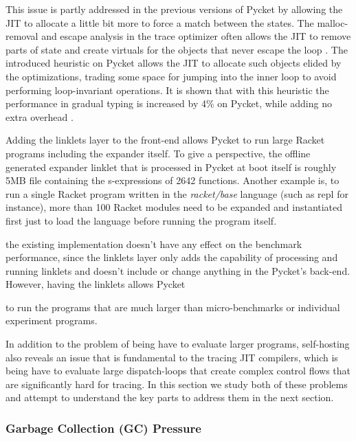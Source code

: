 This issue is partly addressed in the previous versions of Pycket by
allowing the JIT to allocate a little bit more to force a match
between the states. The malloc-removal and escape analysis in the
trace optimizer often allows the JIT to remove parts of state and
create virtuals for the objects that never escape the loop
\cite{malloc-removal:11, loop-aware:12}. The introduced heuristic on
Pycket allows the JIT to allocate such objects elided by the
optimizations, trading some space for jumping into the inner loop to
avoid performing loop-invariant operations. It is shown that with this
heuristic the performance in gradual typing is increased by 4\% on
Pycket, while adding no extra overhead \cite{pycket17}.

Adding the linklets layer to the front-end allows Pycket to run large
Racket programs including the expander itself. To give a perspective,
the offline generated expander linklet that is processed in Pycket at
boot itself is roughly 5MB file containing the s-expressions of 2642
functions. Another example is, to run a single Racket program written
in the \emph{racket/base} language (such as repl for instance), more
than 100 Racket modules need to be expanded and instantiated first
just to load the language before running the program itself.


the existing
implementation doesn't have any effect on the benchmark performance,
since the linklets layer only adds the capability of processing and
running linklets and doesn't include or change anything in the
Pycket's back-end. However, having the linklets allows Pycket

to run the programs that are much larger than micro-benchmarks or
individual experiment programs.



In addition to the problem of being have to evaluate larger programs,
self-hosting also reveals an issue that is fundamental to the tracing
JIT compilers, which is being have to evaluate large dispatch-loops
that create complex control flows that are significantly hard for
tracing. In this section we study both of these problems and attempt
to understand the key parts to address them in the next section.

\subsubsection{Garbage Collection (GC) Pressure}

